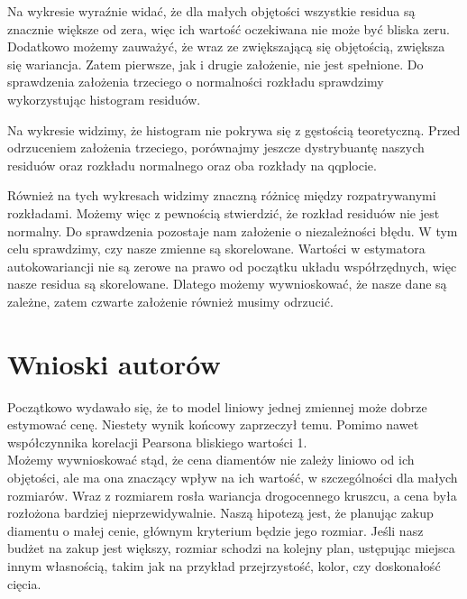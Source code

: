 \documentclass[12pt]{article}
\theoremstyle{exer}
\begin{document}
	Na wykresie wyraźnie widać, że dla małych objętości wszystkie residua są znacznie większe od zera, więc ich wartość oczekiwana nie może być bliska zeru. Dodatkowo możemy zauważyć, że wraz ze zwiększającą się objętością, zwiększa się wariancja. Zatem pierwsze, jak i drugie założenie, nie jest spełnione. Do sprawdzenia założenia trzeciego o normalności rozkładu sprawdzimy wykorzystując histogram residuów.
	
	Na wykresie widzimy, że histogram nie pokrywa się z gęstością teoretyczną. Przed odrzuceniem założenia trzeciego, porównajmy jeszcze dystrybuantę naszych residuów oraz rozkładu normalnego oraz oba rozkłady na qqplocie.

	Również na tych wykresach widzimy znaczną różnicę między rozpatrywanymi rozkładami. Możemy więc z pewnością stwierdzić, że rozkład residuów nie jest normalny. Do sprawdzenia pozostaje nam założenie o niezależności błędu. W tym celu sprawdzimy, czy nasze zmienne są skorelowane.
	Wartości w estymatora autokowariancji nie są zerowe na prawo od początku układu współrzędnych, więc nasze residua są skorelowane. Dlatego możemy wywnioskować, że nasze dane są zależne, zatem czwarte założenie również musimy odrzucić.
	
	\section{Wnioski autorów}
	Początkowo wydawało się, że to model liniowy jednej zmiennej może dobrze estymować cenę. Niestety wynik końcowy zaprzeczył temu. Pomimo nawet współczynnika korelacji Pearsona bliskiego wartości 1.\\
	Możemy wywnioskować stąd, że cena diamentów nie zależy liniowo od ich objętości, ale ma ona znaczący wpływ na ich wartość, w szczególności dla małych rozmiarów. Wraz z rozmiarem rosła wariancja drogocennego kruszcu, a cena była rozłożona bardziej nieprzewidywalnie. Naszą hipotezą jest, że planując zakup diamentu o małej cenie, głównym kryterium będzie jego rozmiar. Jeśli nasz budżet na zakup jest większy, rozmiar schodzi na kolejny plan, ustępując miejsca innym własnością, takim jak na przykład przejrzystość, kolor, czy doskonałość cięcia.
	
\end{document}
